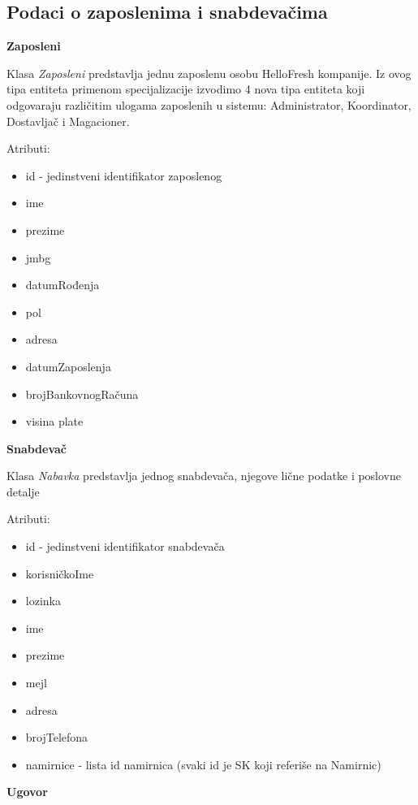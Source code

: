 
\subsection{Podaci o zaposlenima i snabdevačima}

\textbf{\large Zaposleni}
\vspace{0.3cm}

Klasa \textit{Zaposleni} predstavlja jednu zaposlenu osobu HelloFresh kompanije. Iz ovog tipa entiteta primenom specijalizacije izvodimo 4 nova tipa entiteta koji odgovaraju različitim ulogama zaposlenih u sistemu: Administrator, Koordinator, Dostavljač i Magacioner.

Atributi:
\begin{itemize}
    \item id - jedinstveni identifikator zaposlenog
    \item ime
    \item prezime
    \item jmbg
    \item datumRođenja
    \item pol
    \item adresa
    \item datumZaposlenja
    \item brojBankovnogRačuna
    \item visina plate
\end{itemize}

\textbf{\large Snabdevač}
\vspace{0.3cm}

Klasa \textit{Nabavka} predstavlja jednog snabdevača, njegove lične podatke i poslovne detalje

Atributi:
\begin{itemize}
    \item id - jedinstveni identifikator snabdevača
    \item korisničkoIme
    \item lozinka
    \item ime
    \item prezime
    \item mejl
    \item adresa
    \item brojTelefona
    \item namirnice - lista id namirnica (svaki id je SK koji referiše na Namirnic)
\end{itemize}

\textbf{\large Ugovor}
\vspace{0.3cm}


